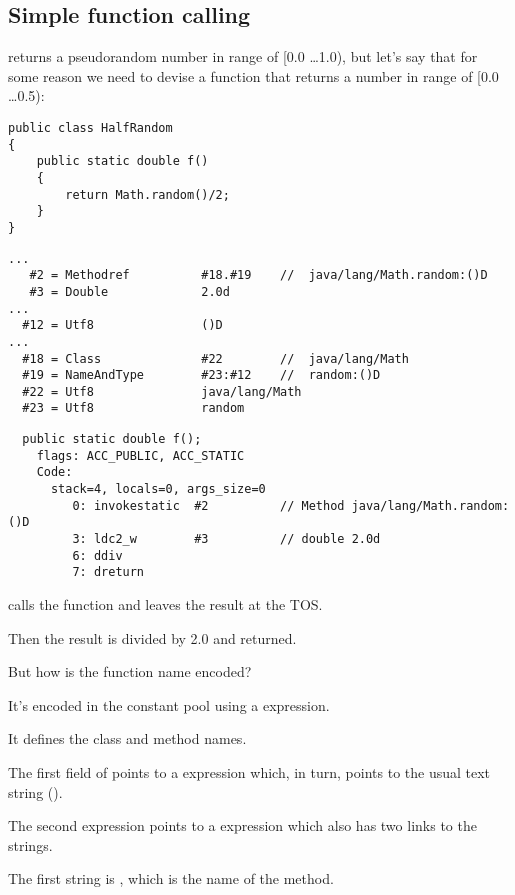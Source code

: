 \subsection{Simple function calling}

 returns a pseudorandom number in range of [0.0 \dots 1.0), but let's say that
for some reason we need to devise a function that returns a number in range of [0.0 \dots 0.5):


\begin{lstlisting}[style=customjava]
public class HalfRandom
{ 
	public static double f()
	{
		return Math.random()/2;
	}
}
\end{lstlisting}

\begin{lstlisting}[caption=Constant pool]
...
   #2 = Methodref          #18.#19    //  java/lang/Math.random:()D
   #3 = Double             2.0d
...
  #12 = Utf8               ()D
...
  #18 = Class              #22        //  java/lang/Math
  #19 = NameAndType        #23:#12    //  random:()D
  #22 = Utf8               java/lang/Math
  #23 = Utf8               random
\end{lstlisting}

\begin{lstlisting}
  public static double f();
    flags: ACC_PUBLIC, ACC_STATIC
    Code:
      stack=4, locals=0, args_size=0
         0: invokestatic  #2          // Method java/lang/Math.random:()D
         3: ldc2_w        #3          // double 2.0d
         6: ddiv          
         7: dreturn       
\end{lstlisting}

 calls the  function and leaves the result at the \ac{TOS}.

Then the result is divided by 2.0 and returned.

But how is the function name encoded?

It's encoded in the constant pool using a  expression.

It defines the class and method names.

The first field of  points to a  expression which, in turn, points to
the usual text string ().

The second  expression points to a  expression which also 
has two links to the strings.

The first string is , which is the name of the method.

